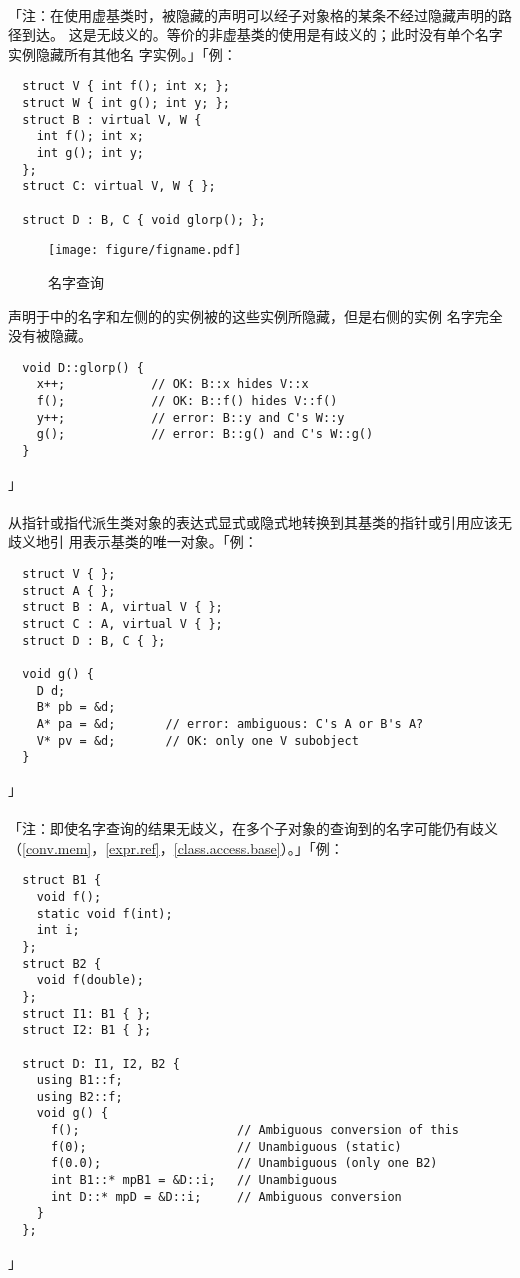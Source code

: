 \paragraph{}
「注：在使用虚基类时，被隐藏的声明可以经子对象格的某条不经过隐藏声明的路径到达。
这是无歧义的。等价的非虚基类的使用是有歧义的；此时没有单个名字实例隐藏所有其他名
字实例。」「例：
\begin{lstlisting}
  struct V { int f(); int x; };
  struct W { int g(); int y; };
  struct B : virtual V, W {
    int f(); int x;
    int g(); int y;
  };
  struct C: virtual V, W { };

  struct D : B, C { void glorp(); };
\end{lstlisting}
\begin{figure}[htpb]
  \centering
  \texttt{[image: figure/figname.pdf]}
  \caption{名字查询}
  \label{fig:name}
\end{figure}
声明于中的名字和左侧的的实例被的这些实例所隐藏，但是右侧的实例
名字完全没有被隐藏。
\begin{lstlisting}
  void D::glorp() {
    x++;            // OK: B::x hides V::x
    f();            // OK: B::f() hides V::f()
    y++;            // error: B::y and C's W::y
    g();            // error: B::g() and C's W::g()
  }
\end{lstlisting}」

\paragraph{}
从指针或指代派生类对象的表达式显式或隐式地转换到其基类的指针或引用应该无歧义地引
用表示基类的唯一对象。「例：
\begin{lstlisting}
  struct V { };
  struct A { };
  struct B : A, virtual V { };
  struct C : A, virtual V { };
  struct D : B, C { };

  void g() {
    D d;
    B* pb = &d;
    A* pa = &d;       // error: ambiguous: C's A or B's A?
    V* pv = &d;       // OK: only one V subobject
  }
\end{lstlisting}」

\paragraph{}
「注：即使名字查询的结果无歧义，在多个子对象的查询到的名字可能仍有歧义
（\ref{conv.mem}，\ref{expr.ref}，\ref{class.access.base}）。」「例：
\begin{lstlisting}
  struct B1 {
    void f();
    static void f(int);
    int i;
  };
  struct B2 {
    void f(double);
  };
  struct I1: B1 { };
  struct I2: B1 { };

  struct D: I1, I2, B2 {
    using B1::f;
    using B2::f;
    void g() {
      f();                      // Ambiguous conversion of this
      f(0);                     // Unambiguous (static)
      f(0.0);                   // Unambiguous (only one B2)
      int B1::* mpB1 = &D::i;   // Unambiguous
      int D::* mpD = &D::i;     // Ambiguous conversion
    }
  };
\end{lstlisting}」


